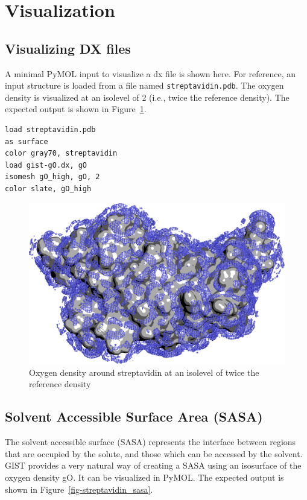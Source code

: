\documentclass[9pt,tutorial]{livecoms}
\newcommand\inlinecode{\texttt}
\begin{document}
\section{Visualization}

\subsection{Visualizing DX files}
A minimal PyMOL input to visualize a dx file is shown here.
For reference, an input structure is loaded from a file named \inlinecode{streptavidin.pdb}.
The oxygen density is visualized at an isolevel of 2 (i.e., twice the reference density).
The expected output is shown in Figure~\ref{fig-streptavidin_gO}.

\begin{lstlisting}[style=pymol]
load streptavidin.pdb
as surface
color gray70, streptavidin
load gist-gO.dx, gO
isomesh gO_high, gO, 2
color slate, gO_high
\end{lstlisting}


\begin{figure}
	\centering
	\includegraphics[width=1.0\linewidth]{figures/streptavidin_gO_high_surf.png}
	\caption{Oxygen density around streptavidin at an isolevel of twice the reference density}\label{fig-streptavidin_gO}
\end{figure}

\subsection{Solvent Accessible Surface Area (SASA)}

The solvent accessible surface (SASA) represents the interface between regions that are occupied by the solute, and those which can be accessed by the solvent.
GIST provides a very natural way of creating a SASA using an isosurface of the oxygen density gO.
It can be visualized in PyMOL.
The expected output is shown in Figure~\ref{fig-streptavidin_sasa}.
\end{document}

